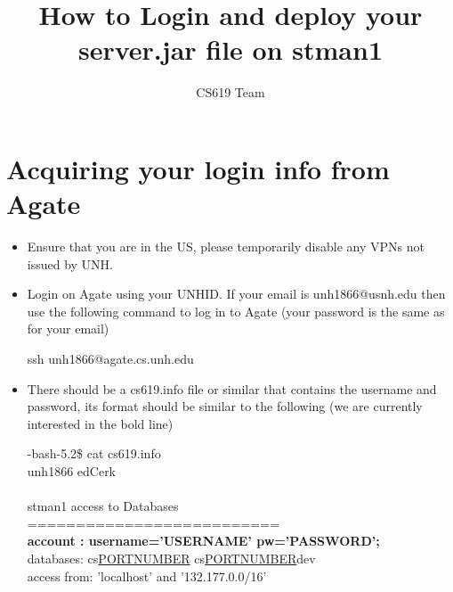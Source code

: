\documentclass{article}
\title{How to Login and deploy your server.jar file on stman1}
\author{CS619 Team}
\begin{document}
\maketitle

\section{Acquiring your login info from Agate}
\label{sec:get_login_info}
\begin{itemize}
	\item Ensure that you are in the US, please temporarily disable any VPNs not issued by UNH.
	\item Login on Agate using your UNHID. If your email is unh1866@usnh.edu then use the following command to log in to Agate (your password is the same as for your email)
	      \begin{tcolorbox}
		      ssh unh1866@agate.cs.unh.edu
	      \end{tcolorbox}
	\item There should be a cs619.info file or similar that contains the username and password, its format should be similar to the following (we are currently interested in the bold line)
	      \begin{tcolorbox}
		      -bash-5.2\$ cat cs619.info \\
		      unh1866 edCerk \\
		      \\
		      stman1 access to Databases\\
		      ==========================\\
		      \textbf{account :    username='USERNAME'    pw='PASSWORD';}\\
		      databases:   cs\underline{PORTNUMBER} cs\underline{PORTNUMBER}dev\\
		      access from: 'localhost' and '132.177.0.0/16'\\
	      \end{tcolorbox}
\end{itemize}
\end{document}
